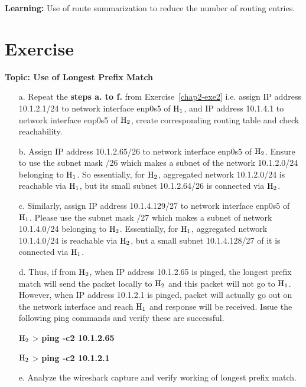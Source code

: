 \begin{multicols}{2}
\textbf{Learning:} Use of route summarization to reduce the number of routing entries.

\section*{Exercise \label{chap2-exe4}}

\textbf{Topic: Use of Longest Prefix Match}

\begin{itemize}
\item[a.] Repeat the \textbf{steps a. to f.} from  Exercise~\ref{chap2-exe2} i.e. assign IP address 10.1.2.1/24 to network interface enp0s5 of ${\rm H}_{1}$, and IP address 10.1.4.1 to network interface enp0s5 of ${\rm H}_{2}$, create corresponding routing table and check reachability.

\item[b.] Assign IP address 10.1.2.65/26 to network interface enp0s5 of ${\rm H}_{2}$. Ensure to use the subnet mask /26 which makes a subnet of the network 10.1.2.0/24 belonging to ${\rm H}_{1}$. So essentially, for ${\rm H}_{2}$, aggregated network 10.1.2.0/24 is reachable via ${\rm H}_{1}$, but its small subnet 10.1.2.64/26 is connected via ${\rm H}_{2}$.

\item[c.] Similarly, assign IP address 10.1.4.129/27 to network interface enp0s5 of ${\rm H}_{1}$. Please use the subnet mask /27 which makes a subnet of network 10.1.4.0/24 belonging to ${\rm H}_{2}$. Essentially, for ${\rm H}_{1}$, aggregated network 10.1.4.0/24 is reachable via ${\rm H}_{2}$, but a small subnet 10.1.4.128/27 of it is connected via ${\rm H}_{1}$.

\item[d.] Thus, if from ${\rm H}_{2}$, when IP address 10.1.2.65 is pinged, the longest prefix match will send the packet locally to ${\rm H}_{2}$ and this packet will not go to ${\rm H}_{1}$. However, when IP address 10.1.2.1 is pinged, packet will actually go out on the network interface and reach ${\rm H}_{1}$ and response will be received. Issue the following ping commands and verify these are successful.

${\rm H}_{2}$ > \textbf{ping -c2 10.1.2.65}

${\rm H}_{2}$ > \textbf{ping -c2 10.1.2.1}

\item[e.] Analyze the wireshark capture and verify working of longest prefix match.


\end{itemize}
\end{multicols}
